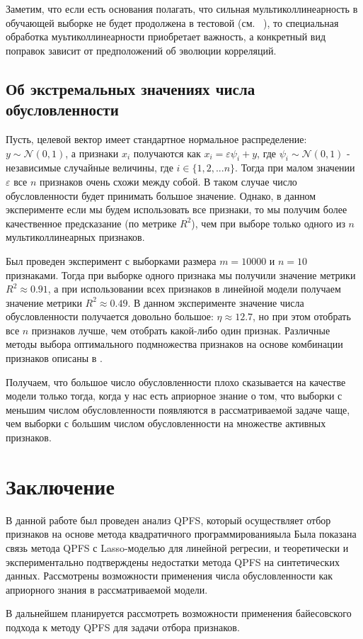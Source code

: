 \documentclass[12pt, twoside]{article}
\newcommand{\cN}{\mathcal{N}}
\begin{document}
Заметим, что если есть основания полагать, что сильная мультиколлинеарность в обучающей выборке не будет продолжена в тестовой (см. ~\cite{multicollinearity_need_no_continuation}), то специальная обработка муьтиколлинеарности приобретает важность, а конкретный вид поправок зависит от предположений об эволюции корреляций.

\subsection{Об экстремальных значениях числа обусловленности}

Пусть, целевой вектор имеет стандартное нормальное распределение: $y \sim \cN(0, 1)$, а признаки $x_i$ получаются как $x_i = \varepsilon \psi_i + y$, где $\psi_i \sim \cN(0, 1)$ - независимые случайные величины, где $i \in \{1, 2, ... n \}$. Тогда при малом значении $\varepsilon$ все $n$ признаков очень схожи между собой. В таком случае число обусловленности будет принимать большое значение. Однако, в данном эксперименте если мы будем использовать все признаки, то мы получим более качественное предсказание (по метрике $R^2$), чем при выборе только одного из $n$ мультиколлинеарных признаков.

Был проведен эксперимент с выборками размера $m = 10000$ и $n = 10$ признаками. Тогда при выборке одного признака мы получили значение метрики $R^2 \approx 0.91$, а при использовании всех признаков в линейной модели получаем значение метрики $R^2 \approx 0.49$. В данном эксперименте значение числа обусловленности получается довольно большое: $\eta \approx 12.7$, но при этом отобрать все $n$ признаков лучше, чем отобрать какой-либо один признак. Различные методы выбора оптимального подмножества признаков на основе комбинации признаков описаны в \cite{Aduenko}.

Получаем, что большое число обусловленности плохо сказывается на качестве модели только тогда, когда у нас есть априорное знание о том, что выборки с меньшим числом обусловленности появляются в рассматриваемой задаче чаще, чем выборки с большим числом обусловленности на множестве активных признаков. 

\section{Заключение}
В данной работе был проведен анализ QPFS, который осуществляет отбор признаков на основе метода квадратичного программированияыла Была показана связь метода QPFS с Lasso-моделью для линейной регресии, и теоретически и экспериментально подтверждены недостатки метода QPFS на синтетических данных. Рассмотрены возможности применения числа обусловленности как априорного знания в рассматриваемой модели.

В дальнейшем планируется рассмотреть возможности применения байесовского подхода к методу QPFS для задачи отбора признаков.



\nocite{*}
\end{document}
